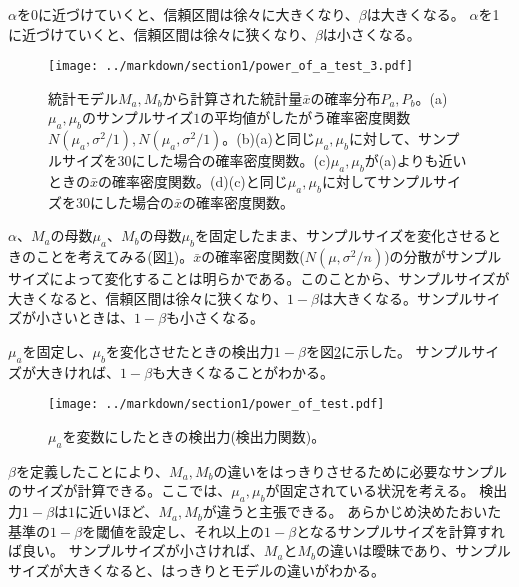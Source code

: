 \documentclass[a4paper,11pt,dvipdfmx]{jsarticle}
\begin{document}
$\alpha$を0に近づけていくと、信頼区間は徐々に大きくなり、$\beta$は大きくなる。
$\alpha$を1に近づけていくと、信頼区間は徐々に狭くなり、$\beta$は小さくなる。



\begin{figure}
    \begin{center}
        \texttt{[image: ../markdown/section1/power\_of\_a\_test\_3.pdf]}
        \caption{統計モデル$M_a,M_b$から計算された統計量$\bar{x}$の確率分布$P_a,P_b$。(a)$\mu_a,\mu_b$のサンプルサイズ$1$の平均値がしたがう確率密度関数$N(\mu_a,\sigma^2/1),N(\mu_a,\sigma^2/1)$。(b)(a)と同じ$\mu_a,\mu_b$に対して、サンプルサイズを$30$にした場合の確率密度関数。(c)$\mu_a,\mu_b$が(a)よりも近いときの$\bar{x}$の確率密度関数。(d)(c)と同じ$\mu_a,\mu_b$に対してサンプルサイズを$30$にした場合の$\bar{x}$の確率密度関数。}
        \label{fig:power_of_test_alpha_beta_sample_size}
    \end{center}
    \end{figure}

    

$\alpha$、$M_a$の母数$\mu_a$、$M_b$の母数$\mu_b$を固定したまま、サンプルサイズを変化させるときのことを考えてみる(図\ref{fig:power_of_test_alpha_beta_sample_size})。$\bar{x}$の確率密度関数($N(\mu,\sigma^2/n)$)の分散がサンプルサイズによって変化することは明らかである。このことから、サンプルサイズが大きくなると、信頼区間は徐々に狭くなり、$1-\beta$は大きくなる。サンプルサイズが小さいときは、$1-\beta$も小さくなる。

$\mu_a$を固定し、$\mu_b$を変化させたときの検出力$1-\beta$を図\ref{fig:power_of_test_N_mu0_variable}に示した。
サンプルサイズが大きければ、$1-\beta$も大きくなることがわかる。

\begin{figure}
    \begin{center}
        \texttt{[image: ../markdown/section1/power\_of\_test.pdf]}
        \label{fig:power_of_test_N_mu0_variable}
        \caption{$\mu_a$を変数にしたときの検出力(検出力関数)。}
    \end{center}
\end{figure}

$\beta$を定義したことにより、$M_a,M_b$の違いをはっきりさせるために必要なサンプルのサイズが計算できる。ここでは、$\mu_a,\mu_b$が固定されている状況を考える。
検出力$1-\beta$は$1$に近いほど、$M_a,M_b$が違うと主張できる。
あらかじめ決めたおいた基準の$1-\beta$を閾値を設定し、それ以上の$1-\beta$となるサンプルサイズを計算すれば良い。
サンプルサイズが小さければ、$M_a$と$M_b$の違いは曖昧であり、サンプルサイズが大きくなると、はっきりとモデルの違いがわかる。
\end{document}
